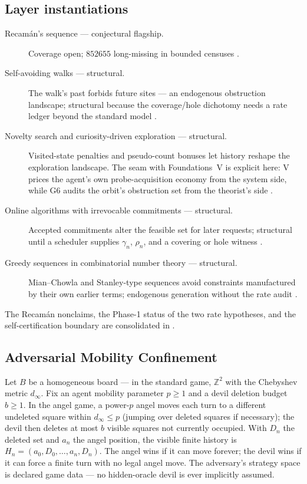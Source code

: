 \documentclass[11pt]{article}
\newcommand{\lawGSeven}{Adversarial Mobility Confinement}
\theoremstyle{definition}
\begin{document}
\subsection*{Layer instantiations}\label{layer-inst:G6}
\begin{description}
  \item[Recam\'an's sequence --- conjectural flagship.] Coverage open; $852655$ long-missing in
    bounded censuses \citep{OEIS-A005132,OEIS-A057167}.
  \item[Self-avoiding walks --- structural.] The walk's past forbids future sites --- an endogenous
    obstruction landscape; structural because the coverage/hole dichotomy needs a rate ledger beyond
    the standard model \citep{MadrasSlade1993,Flory1953}.
  \item[Novelty search and curiosity-driven exploration --- structural.] Visited-state penalties and
    pseudo-count bonuses let history reshape the exploration landscape. The seam with Foundations~V
    is explicit here: V prices the agent's own probe-acquisition economy from the system side, while
    G6 audits the orbit's obstruction set from the theorist's side
    \citep{BellemareEtAl2016,FoundationsVCognition}.
  \item[Online algorithms with irrevocable commitments --- structural.] Accepted commitments alter
    the feasible set for later requests; structural until a scheduler supplies $\gamma_n$, $\rho_n$,
    and a covering or hole witness \citep{BorodinElYaniv1998,BoyarEtAl}.
  \item[Greedy sequences in combinatorial number theory --- structural.] Mian--Chowla and
    Stanley-type sequences avoid constraints manufactured by their own earlier terms; endogenous
    generation without the rate audit \citep{MianChowla1944,Rolnick}.
\end{description}

The Recam\'an nonclaims, the Phase-1 status of the two rate hypotheses, and the self-certification
boundary are consolidated in .

\subsection{\lawGSeven}\label{sec:clusterB:g7}

Let $B$ be a homogeneous board --- in the standard game, $\mathbb{Z}^2$ with the Chebyshev metric
$d_\infty$. Fix an agent mobility parameter $p \ge 1$ and a devil deletion budget $b \ge 1$. In the
angel game, a power-$p$ angel moves each turn to a different undeleted square within
$d_\infty \le p$ (jumping over deleted squares if necessary); the devil then deletes at most $b$
visible squares not currently occupied. With $D_n$ the deleted set and $a_n$ the angel position, the
visible finite history is $H_n = (a_0, D_0, \ldots, a_n, D_n)$. The angel wins if it can move
forever; the devil wins if it can force a finite turn with no legal angel move. The adversary's
strategy space is declared game data --- no hidden-oracle devil is ever implicitly assumed.
\end{document}
